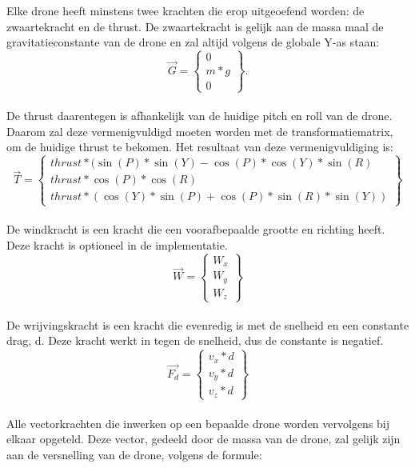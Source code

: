 \\
\\
Elke drone heeft minstens twee krachten die erop uitgeoefend worden: de zwaartekracht en de thrust. De zwaartekracht is gelijk aan de massa maal de gravitatieconstante van de drone en zal altijd volgens de globale Y-as staan: \\
\begin{equation*} 
\vec{G} =
\begin{Bmatrix}
0 \\
m * g \\
0 
\end{Bmatrix}.
\end{equation*} 
\\
De thrust daarentegen is afhankelijk van de huidige pitch en roll van de drone. Daarom zal deze vermenigvuldigd moeten worden met de transformatiematrix, om de huidige thrust te bekomen. Het resultaat van deze vermenigvuldiging is: 
\begin{equation*} 
\vec{T} = 
\begin{Bmatrix}
thrust*(\sin(P)*\sin(Y) - \cos(P)*\cos(Y)*\sin(R)\\ 
thrust*\cos(P)*\cos(R) \\
thrust*(\cos(Y)*\sin(P) + \cos(P)*\sin(R)*\sin(Y))
\end{Bmatrix}
\end{equation*}
\\
De windkracht is een kracht die een voorafbepaalde grootte en richting heeft. Deze kracht is optioneel in de implementatie. \\
\begin{equation*}
\vec{W} = 
\begin{Bmatrix}
W_x \\
W_y \\
W_z 
\end{Bmatrix}
\end{equation*}
\\
De wrijvingskracht is een kracht die evenredig is met de snelheid en een constante drag, d. Deze kracht werkt in tegen de snelheid, dus de constante is negatief. \\
\begin{equation*}
\vec{F_d} = 
\begin{Bmatrix}
v_x * d \\
v_y * d \\
v_z * d
\end{Bmatrix}
\end{equation*} \\
Alle vectorkrachten die inwerken op een bepaalde drone worden vervolgens bij elkaar opgeteld. Deze vector, gedeeld door de massa van de drone, zal gelijk zijn aan de versnelling van de drone, volgens de formule: \\
